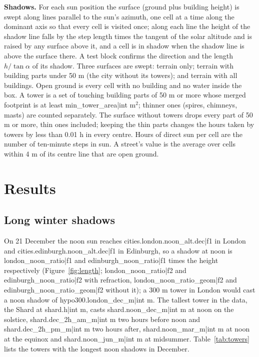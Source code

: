 \documentclass[11pt,a4paper]{article}
\begin{document}
\textbf{Shadows.} For each sun position the surface (ground plus building height) is swept along lines parallel to the sun's azimuth, one cell at a time along the dominant axis so that every cell is visited once; along each line the height of the shadow line falls by the step length times the tangent of the solar altitude and is raised by any surface above it, and a cell is in shadow when the shadow line is above the surface there. A test block confirms the direction and the length $h/\tan\alpha$ of its shadow. Three surfaces are swept: terrain only; terrain with building parts under 50 m (the city without its towers); and terrain with all buildings. Open ground is every cell with no building and no water inside the box. A tower is a set of touching building parts of 50 m or more whose merged footprint is at least {{min_tower_area|int}} m$^2$; thinner ones (spires, chimneys, masts) are counted separately. The surface without towers drops every part of 50 m or more, thin ones included; keeping the thin parts changes the hours taken by towers by less than 0.01 h in every centre. Hours of direct sun per cell are the number of ten-minute steps in sun. A street's value is the average over cells within 4 m of its centre line that are open ground.

\section{Results}
\subsection{Long winter shadows}
On 21 December the noon sun reaches {{cities.london.noon_alt.dec|f1}}\textdegree{} in London and {{cities.edinburgh.noon_alt.dec|f1}}\textdegree{} in Edinburgh, so a shadow at noon is {{london_noon_ratio|f1}} and {{edinburgh_noon_ratio|f1}} times the height respectively (Figure~\ref{fig:length}; {{london_noon_ratio|f2}} and {{edinburgh_noon_ratio|f2}} with refraction, {{london_noon_ratio_geom|f2}} and {{edinburgh_noon_ratio_geom|f2}} without it); a 300 m tower in London would cast a noon shadow of {{hypo300.london_dec_m|int}} m. The tallest tower in the data, the Shard at {{shard.h|int}} m, casts {{shard.noon_dec_m|int}} m at noon on the solstice, {{shard.dec_2h_am_m|int}} m two hours before noon and {{shard.dec_2h_pm_m|int}} m two hours after, {{shard.noon_mar_m|int}} m at noon at the equinox and {{shard.noon_jun_m|int}} m at midsummer. Table~\ref{tab:towers} lists the towers with the longest noon shadows in December.
\end{document}
